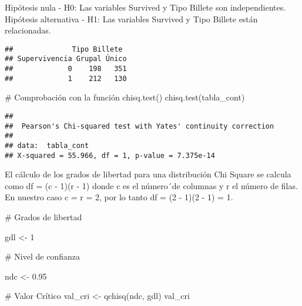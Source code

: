 \documentclass[
]{article}
\newenvironment{Shaded}{\begin{snugshade}}{\end{snugshade}}
\newcommand{\CommentTok}[1]{\textcolor[rgb]{0.50,0.62,0.50}{#1}}
\newcommand{\DataTypeTok}[1]{\textcolor[rgb]{0.87,0.87,0.75}{#1}}
\newcommand{\DecValTok}[1]{\textcolor[rgb]{0.86,0.86,0.80}{#1}}
\newcommand{\FloatTok}[1]{\textcolor[rgb]{0.75,0.75,0.82}{#1}}
\newcommand{\KeywordTok}[1]{\textcolor[rgb]{0.94,0.87,0.69}{#1}}
\newcommand{\NormalTok}[1]{\textcolor[rgb]{0.80,0.80,0.80}{#1}}
\newcommand{\OperatorTok}[1]{\textcolor[rgb]{0.94,0.94,0.82}{#1}}
\newcommand{\StringTok}[1]{\textcolor[rgb]{0.80,0.58,0.58}{#1}}
\begin{document}
Hipótesis nula - H0: Las variables Survived y Tipo Billete son
independientes.\\
Hipótesis alternativa - H1: Las variables Survived y Tipo Billete están
relacionadas.

\begin{Shaded}
\end{Shaded}

\begin{verbatim}
##              Tipo Billete
## Supervivencia Grupal Único
##             0    198   351
##             1    212   130
\end{verbatim}

\begin{Shaded}
\begin{Highlighting}[]
\CommentTok{# Comprobación con la función chisq.test()}
\KeywordTok{chisq.test}\NormalTok{(tabla_cont)}
\end{Highlighting}
\end{Shaded}

\begin{verbatim}
## 
##  Pearson's Chi-squared test with Yates' continuity correction
## 
## data:  tabla_cont
## X-squared = 55.966, df = 1, p-value = 7.375e-14
\end{verbatim}

El cálculo de los grados de libertad para una distribución Chi Square se
calcula como df = (c - 1)(r - 1) donde c es el número´de columnas y r el
número de filas. En nuestro caso c = r = 2, por lo tanto df = (2 - 1)(2
- 1) = 1.

\begin{Shaded}
\begin{Highlighting}[]
\CommentTok{# Grados de libertad}

\NormalTok{gdl <-}\StringTok{ }\DecValTok{1}

\CommentTok{# Nivel de confianza}

\NormalTok{ndc <-}\StringTok{ }\FloatTok{0.95}


\CommentTok{# Valor Crítico}
\NormalTok{val_cri <-}\StringTok{ }\KeywordTok{qchisq}\NormalTok{(ndc, gdl)}
\NormalTok{val_cri}
\end{Highlighting}
\end{Shaded}
\end{document}
